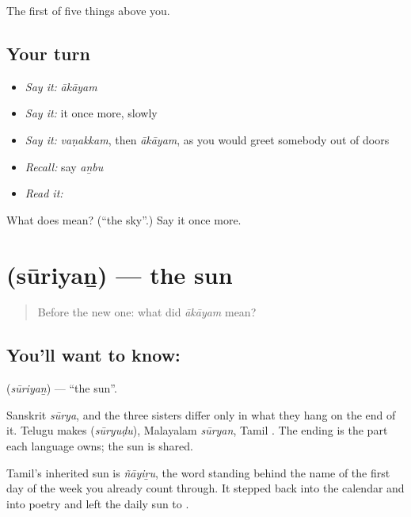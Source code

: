 \begin{grammarlens}[title={What you've built}]
The first of five things above you.
\end{grammarlens}

\subsection*{Your turn}
\begin{itemize}
\raggedright
  \item \emph{Say it:} \emph{ākāyam}
  \item \emph{Say it:} it once more, slowly
  \item \emph{Say it:} \emph{vaṇakkam}, then \emph{ākāyam}, as you would greet somebody out of doors
  \item \emph{Recall:} say \emph{aṉbu}
  \item \emph{Read it:} \textbf{}
\end{itemize}

\begin{tcolorbox}[breakable,colback=teal!4,colframe=teal!35!black,title={Before you move on}]
What does  mean? (\textquotedblleft{}the sky\textquotedblright{}.) Say it once more.
\end{tcolorbox}
\section[\texorpdfstring{\ta{சூரியன்} (sūriyaṉ)}{சூரியன் (sūriyaṉ)}]{ (sūriyaṉ) — the sun}

\label{lesson:TA-C51-sun}



\begin{quote}
Before the new one: what did \emph{ākāyam} mean?
\end{quote}

\subsection*{You'll want to know: }
\textbf{} (\emph{sūriyaṉ}) — \textquotedblleft{}the sun\textquotedblright{}.

Sanskrit \emph{sūrya}, and the three sisters differ only in what they hang on the end of it. Telugu makes  (\emph{sūryuḍu}), Malayalam \emph{sūryan}, Tamil . The ending is the part each language owns; the sun is shared.

Tamil's inherited sun is \emph{ñāyiṟu}, the word standing behind the name of the first day of the week you already count through. It stepped back into the calendar and into poetry and left the daily sun to .

